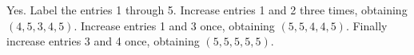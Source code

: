 Yes. Label the entries 1 through 5. Increase entries 1 and 2 three times, obtaining $(4,5,3,4,5)$. Increase entries 1 and 3 once, obtaining $(5,5,4,4,5)$. Finally increase entries 3 and 4 once, obtaining $\boxed{(5,5,5,5,5)}$.
